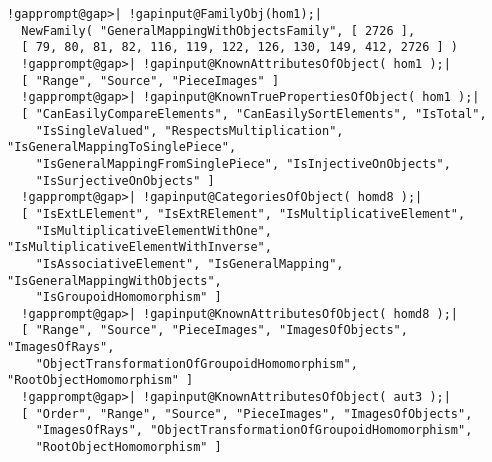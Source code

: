 \documentclass[a4paper,11pt]{report}
\begin{document}
{{\begin{Verbatim}[commandchars=!@|,fontsize=\small,frame=single,label=Example]
  !gapprompt@gap>| !gapinput@FamilyObj(hom1);|
  NewFamily( "GeneralMappingWithObjectsFamily", [ 2726 ], 
  [ 79, 80, 81, 82, 116, 119, 122, 126, 130, 149, 412, 2726 ] )
  !gapprompt@gap>| !gapinput@KnownAttributesOfObject( hom1 );|
  [ "Range", "Source", "PieceImages" ]
  !gapprompt@gap>| !gapinput@KnownTruePropertiesOfObject( hom1 );|
  [ "CanEasilyCompareElements", "CanEasilySortElements", "IsTotal", 
    "IsSingleValued", "RespectsMultiplication", "IsGeneralMappingToSinglePiece",
    "IsGeneralMappingFromSinglePiece", "IsInjectiveOnObjects", 
    "IsSurjectiveOnObjects" ]
  !gapprompt@gap>| !gapinput@CategoriesOfObject( homd8 );|
  [ "IsExtLElement", "IsExtRElement", "IsMultiplicativeElement", 
    "IsMultiplicativeElementWithOne", "IsMultiplicativeElementWithInverse", 
    "IsAssociativeElement", "IsGeneralMapping", "IsGeneralMappingWithObjects", 
    "IsGroupoidHomomorphism" ]
  !gapprompt@gap>| !gapinput@KnownAttributesOfObject( homd8 );|
  [ "Range", "Source", "PieceImages", "ImagesOfObjects", "ImagesOfRays", 
    "ObjectTransformationOfGroupoidHomomorphism", "RootObjectHomomorphism" ]
  !gapprompt@gap>| !gapinput@KnownAttributesOfObject( aut3 );|
  [ "Order", "Range", "Source", "PieceImages", "ImagesOfObjects", 
    "ImagesOfRays", "ObjectTransformationOfGroupoidHomomorphism", 
    "RootObjectHomomorphism" ]
  
\end{Verbatim}
 }

 }

            
\end{document}
